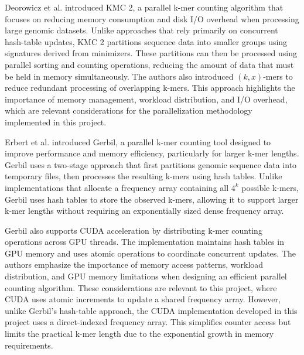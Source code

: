 \documentclass{article}
\begin{document}
\vspace{\baselineskip}

Deorowicz et al. \cite{deorowicz2015kmc2} introduced KMC 2, a parallel k-mer counting algorithm that focuses on reducing memory 
consumption and disk I/O overhead when processing large genomic datasets. Unlike approaches that rely primarily on concurrent hash-table 
updates, KMC 2 partitions sequence data into smaller groups using signatures derived from minimizers. These partitions can then be processed 
using parallel sorting and counting operations, reducing the amount of data that must be held in memory simultaneously. The authors also 
introduced $(k,x)$-mers to reduce redundant processing of overlapping k-mers. This approach highlights the importance of memory management, 
workload distribution, and I/O overhead, which are relevant considerations for the parallelization methodology implemented in this project.

\vspace{\baselineskip}

Erbert et al. \cite{erbert2017gerbil} introduced Gerbil, a parallel k-mer counting tool designed
to improve performance and memory efficiency, particularly for larger k-mer lengths.
Gerbil uses a two-stage approach that first partitions genomic sequence data into temporary
files, then processes the resulting k-mers using hash tables. Unlike implementations that
allocate a frequency array containing all $4^k$ possible k-mers, Gerbil uses hash tables to
store the observed k-mers, allowing it to support larger k-mer lengths without requiring
an exponentially sized dense frequency array.

\vspace{\baselineskip}

Gerbil also supports CUDA acceleration by distributing k-mer counting operations across GPU
threads. The implementation maintains hash tables in GPU memory and uses atomic operations
to coordinate concurrent updates. The authors emphasize the importance of memory access
patterns, workload distribution, and GPU memory limitations when designing an efficient
parallel counting algorithm. These considerations are relevant to this project, where CUDA
uses atomic increments to update a shared frequency array. However, unlike Gerbil's
hash-table approach, the CUDA implementation developed in this project uses a direct-indexed
frequency array. This simplifies counter access but limits the practical k-mer length due
to the exponential growth in memory requirements.
\end{document}
